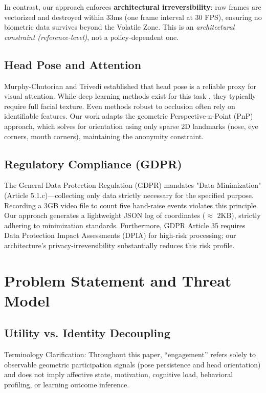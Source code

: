 \documentclass[conference]{IEEEtran}
\begin{document}
In contrast, our approach enforces \textbf{architectural irreversibility}: raw frames are vectorized and destroyed within 33ms (one frame interval at 30 FPS), ensuring no biometric data survives beyond the Volatile Zone. This is an \textit{architectural constraint (reference-level)}, not a policy-dependent one.

\subsection{Head Pose and Attention}
Murphy-Chutorian and Trivedi \cite{b13} established that head pose is a reliable proxy for visual attention. While deep learning methods exist for this task \cite{b14}, they typically require full facial texture. Even methods robust to occlusion \cite{b15} often rely on identifiable features. Our work adapts the geometric Perspective-n-Point (PnP) approach, which solves for orientation using only sparse 2D landmarks (nose, eye corners, mouth corners), maintaining the anonymity constraint.

\subsection{Regulatory Compliance (GDPR)}
The General Data Protection Regulation (GDPR) \cite{b16} mandates "Data Minimization" (Article 5.1.c)—collecting only data strictly necessary for the specified purpose. Recording a 3GB video file to count five hand-raise events violates this principle. Our approach generates a lightweight JSON log of coordinates ($\approx$ 2KB), strictly adhering to minimization standards. Furthermore, GDPR Article 35 requires Data Protection Impact Assessments (DPIA) for high-risk processing; our architecture's privacy-irreversibility substantially reduces this risk profile.

\section{Problem Statement and Threat Model}

\subsection{Utility vs. Identity Decoupling}
Terminology Clarification: Throughout this paper, ``engagement'' refers solely to observable geometric participation signals (pose persistence and head orientation) and does not imply affective state, motivation, cognitive load, behavioral profiling, or learning outcome inference.
\end{document}
